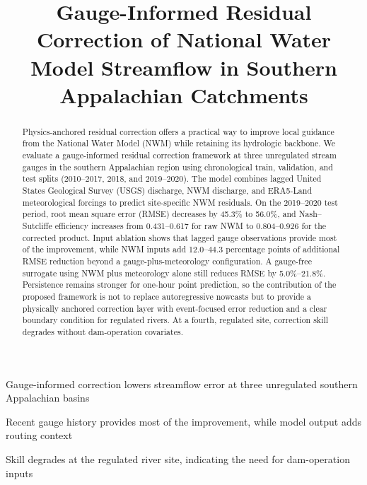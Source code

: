 \documentclass[draft]{agujournal2019}
\begin{document}
\title{Gauge-Informed Residual Correction of National Water Model Streamflow in Southern Appalachian Catchments}




\begin{keypoints}
\item Gauge-informed correction lowers streamflow error at three unregulated southern Appalachian basins
\item Recent gauge history provides most of the improvement, while model output adds routing context
\item Skill degrades at the regulated river site, indicating the need for dam-operation inputs
\end{keypoints}

\begin{abstract}
Physics-anchored residual correction offers a practical way to improve local guidance from the National Water Model (NWM) while retaining its hydrologic backbone. We evaluate a gauge-informed residual correction framework at three unregulated stream gauges in the southern Appalachian region using chronological train, validation, and test splits (2010--2017, 2018, and 2019--2020). The model combines lagged United States Geological Survey (USGS) discharge, NWM discharge, and ERA5-Land meteorological forcings to predict site-specific NWM residuals. On the 2019--2020 test period, root mean square error (RMSE) decreases by 45.3\% to 56.0\%, and Nash--Sutcliffe efficiency increases from 0.431--0.617 for raw NWM to 0.804--0.926 for the corrected product. Input ablation shows that lagged gauge observations provide most of the improvement, while NWM inputs add 12.0--44.3 percentage points of additional RMSE reduction beyond a gauge-plus-meteorology configuration. A gauge-free surrogate using NWM plus meteorology alone still reduces RMSE by 5.0\%--21.8\%. Persistence remains stronger for one-hour point prediction, so the contribution of the proposed framework is not to replace autoregressive nowcasts but to provide a physically anchored correction layer with event-focused error reduction and a clear boundary condition for regulated rivers. At a fourth, regulated site, correction skill degrades without dam-operation covariates.
\end{abstract}
\end{document}

